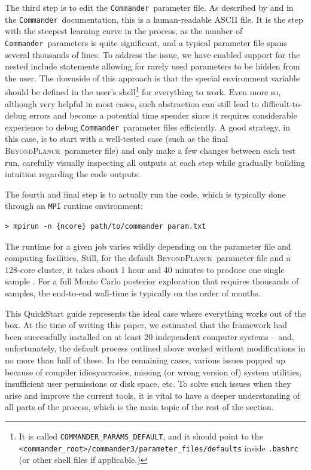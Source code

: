 \documentclass[twocolumn]{aa}
\def\commander{\texttt{Commander}}
\newcommand{\BP}{\textsc{BeyondPlanck}}
\begin{document}
The third step is to edit the \commander\ parameter file. As described by \citet{BP03} and in the \commander\ documentation, this is a human-readable ASCII file. It is the step with the steepest learning curve in the process, as the number of \commander\ parameters is quite significant, and a typical parameter file spans several thousands of lines. To address the issue, we have enabled support for the nested include statements allowing for rarely used parameters to be hidden from the user. The downside of this approach is that the special environment variable should be defined in the user’s shell\footnote{It is called \texttt{COMMANDER\_PARAMS\_DEFAULT}, and it should point to the \texttt{<commander\_root>/commander3/parameter\_files/defaults} inside \texttt{.bashrc} (or other shell files if applicable.)} for everything to work. Even more so, although very helpful in most cases, such abstraction can still lead to difficult-to-debug errors and become a potential time spender since it requires considerable experience to debug \commander\ parameter files efficiently. A good strategy, in this case, is to start with a well-tested case (such as the final \BP\ parameter file) and only make a few changes between each test run, carefully visually inspecting all outputs at each step while gradually building intuition regarding the code outputs.

The fourth and final step is to actually run the code, which is
typically done through an \texttt{MPI} runtime environment:
\begin{verbatim}
> mpirun -n {ncore} path/to/commander param.txt
\end{verbatim}
The runtime for a given job varies wildly depending on the parameter file and computing facilities. Still, for the default \BP\ parameter file and a 128-core cluster, it takes about 1 hour and 40 minutes to produce one single sample \citep{BP03}. For a full Monte Carlo posterior exploration that requires thousands of samples, the end-to-end wall-time is typically on the order of months.

This QuickStart guide represents the ideal case where everything works out of the box. At the time of writing this paper, we estimated that the framework had been successfully installed on at least 20 independent computer systems -- and, unfortunately, the default process outlined above worked without modifications in no more than half of these. In the remaining cases, various issues popped up because of compiler idiosyncrasies, missing (or wrong version of) system utilities, insufficient user permissions or disk space, etc. To solve such issues when they arise and improve the current tools, it is vital to have a deeper understanding of all parts of the process, which is the main topic of the rest of the section.
\end{document}
